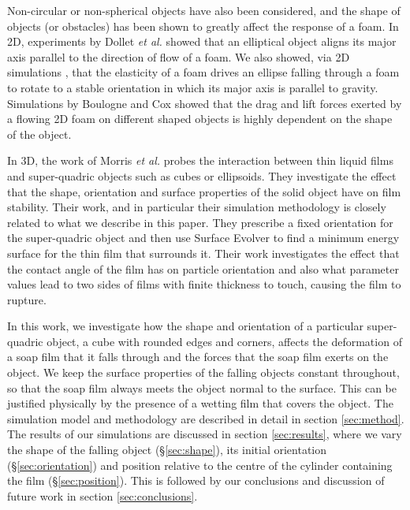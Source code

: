 \documentclass[preprint]{revtex4-1}
\begin{document}
Non-circular or non-spherical objects have also been considered, and the shape of objects (or obstacles) has been shown to greatly affect the response of a foam. In 2D, experiments by Dollet \textit{et al.} \cite{Dolletellipse06} showed that an elliptical object aligns its major axis parallel to the direction of flow of a foam. We also showed, via 2D simulations \cite{Davies10}, that the elasticity of a foam drives an ellipse falling through a foam to rotate to a stable orientation in which its major axis is parallel to gravity. Simulations by Boulogne and Cox \cite{Boulogne11} showed that the drag and lift forces exerted by a flowing 2D foam on different shaped objects is highly dependent on the shape of the object. 

In 3D, the work of Morris \textit{et al.} \cite{Morris10,Morris11,Morris2011} probes the interaction between thin liquid films and super-quadric objects such as cubes or ellipsoids. They investigate the effect that the shape, orientation and surface properties of the solid object have on film stability. Their work, and in particular their simulation methodology is closely related to what we describe in this paper. They prescribe a fixed orientation for the super-quadric object and then use Surface Evolver to find a minimum energy surface for the thin film that surrounds it. Their work investigates the effect that the contact angle of the film has on particle orientation and also what parameter values lead to two sides of films with finite thickness to touch, causing the film to rupture.

In this work, we investigate how the shape and orientation of a particular super-quadric object, a cube with rounded edges and corners, affects the deformation of a soap film that it falls through and the forces that the soap film exerts on the object. We keep the surface properties of the falling objects constant throughout, so that the soap film always meets the object normal to the surface. This can be justified physically by the presence of a wetting film that covers the object. The simulation model and methodology are described in detail in section \ref{sec:method}. The results of our simulations are discussed in section \ref{sec:results}, where we vary the shape of the falling object (\S \ref{sec:shape}), its initial orientation (\S \ref{sec:orientation}) and position relative to the centre of the cylinder containing the film (\S \ref{sec:position}). This is followed by our conclusions and discussion of future work in section \ref{sec:conclusions}. 
\end{document}
